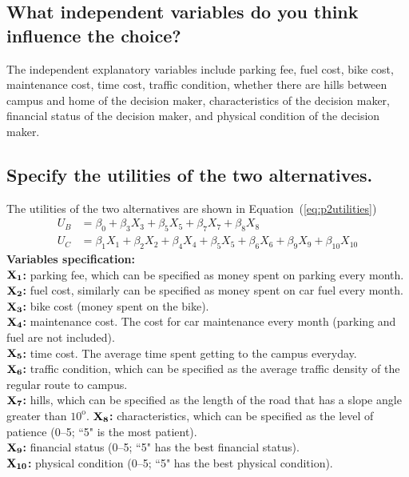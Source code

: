 \documentclass[11pt]{article}
\begin{document}
\subsection{\small{What independent variables do you think influence the choice?}}
The independent explanatory variables include parking fee, fuel cost, bike cost, maintenance cost, time cost, traffic condition, whether there are hills between campus and home of the decision maker, characteristics of the decision maker, financial status of the decision maker, and physical condition of the decision maker.
\subsection{\small{Specify the utilities of the two alternatives.}}
The utilities of the two alternatives are shown in Equation~(\ref{eq:p2utilities})
\begin{equation}\label{eq:p2utilities}
\begin{array}{ll}
U_B&=\beta_0+\beta_3X_3+\beta_5X_5+\beta_7X_7+\beta_8X_8\\
U_C&=\beta_1X_1+\beta_2X_2+\beta_4X_4+\beta_5X_5+\beta_6X_6+\beta_9X_9+\beta_{10}X_{10}
\end{array}
\end{equation}
\textbf{Variables specification:}\\
$\bf{X_1}$\textbf{:} parking fee, which can be specified as money spent on parking every month.\\
$\bf{X_2}$\textbf{:} fuel cost, similarly can be specified as money spent on car fuel every month.\\
$\bf{X_3}$\textbf{:} bike cost (money spent on the bike).\\
$\bf{X_4}$\textbf{:} maintenance cost. The cost for car maintenance every month (parking and fuel are not included).\\
$\bf{X_5}$\textbf{:} time cost. The average time spent getting to the campus everyday.\\
$\bf{X_6}$\textbf{:} traffic condition, which can be specified as the average traffic density of the regular route to campus.\\
$\bf{X_7}$\textbf{:} hills, which can be specified as the length of the road that has a slope angle greater than ${10^\text{o}}$.
$\bf{X_8}$\textbf{:} characteristics, which can be specified as the level of patience (0--5; ``5" is the most patient).\\
$\bf{X_9}$\textbf{:} financial status (0--5; ``5" has the best financial status).\\
$\bf{X_{10}}$\textbf{:} physical condition (0--5; ``5" has the best physical condition).
\end{document}
